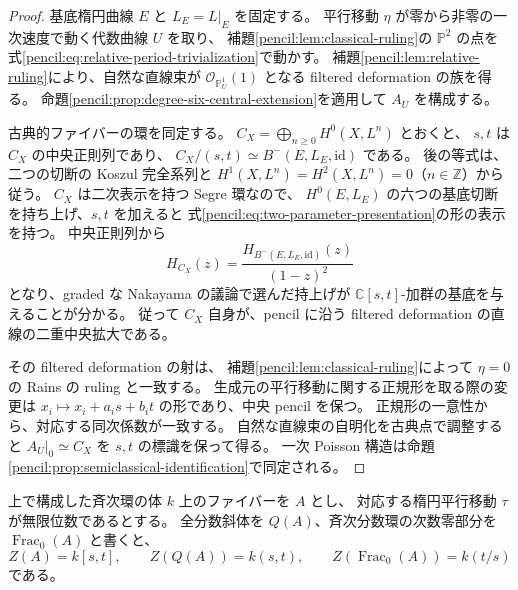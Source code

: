 \begin{proof}
基底楕円曲線 $E$ と $L_E=L|_E$ を固定する。
平行移動 $\eta$ が零から非零の一次速度で動く代数曲線 $U$ を取り、
補題\ref{pencil:lem:classical-ruling}の $\mathbb P^2$ の点を
式\eqref{pencil:eq:relative-period-trivialization}で動かす。
補題\ref{pencil:lem:relative-ruling}により、自然な直線束が
$\mathcal O_{\mathbb P^1_U}(1)$ となる filtered deformation の族を得る。
命題\ref{pencil:prop:degree-six-central-extension}を適用して $A_U$ を構成する。

古典的ファイバーの環を同定する。
$C_X=\bigoplus_{n\geq0}H^0(X,L^n)$ とおくと、
$s,t$ は $C_X$ の中央正則列であり、
$C_X/(s,t)\simeq B^{-}(E,L_E,\mathrm{id})$ である。
後の等式は、二つの切断の Koszul 完全系列と
$H^1(X,L^n)=H^2(X,L^n)=0$（$n\in\mathbb Z$）から従う。
$C_X$ は二次表示を持つ Segre 環なので、
$H^0(E,L_E)$ の六つの基底切断を持ち上げ、$s,t$ を加えると
式\eqref{pencil:eq:two-parameter-presentation}の形の表示を持つ。
中央正則列から
\[
 H_{C_X}(z)=\frac{H_{B^{-}(E,L_E,\mathrm{id})}(z)}{(1-z)^2}
\]
となり、graded な Nakayama の議論で選んだ持上げが
$\mathbb C[s,t]$-加群の基底を与えることが分かる。
従って $C_X$ 自身が、pencil に沿う filtered deformation の直線の二重中央拡大である。

その filtered deformation の射は、
補題\ref{pencil:lem:classical-ruling}によって $\eta=0$ の Rains の ruling と一致する。
生成元の平行移動に関する正規形を取る際の変更は
$x_i\mapsto x_i+a_i s+b_i t$ の形であり、中央 pencil を保つ。
正規形の一意性から、対応する同次係数が一致する。
自然な直線束の自明化を古典点で調整すると
$A_U|_0\simeq C_X$ を $s,t$ の標識を保って得る。
一次 Poisson 構造は命題\ref{pencil:prop:semiclassical-identification}で同定される。
\end{proof}

\begin{proposition}\label{pencil:prop:generic-center}
上で構成した斉次環の体 $k$ 上のファイバーを $A$ とし、
対応する楕円平行移動 $\tau$ が無限位数であるとする。
全分数斜体を $Q(A)$、斉次分数環の次数零部分を $\operatorname{Frac}_0(A)$ と書くと、
\[
 Z(A)=k[s,t],\qquad
 Z(Q(A))=k(s,t),\qquad
 Z(\operatorname{Frac}_0(A))=k(t/s)
\]
である。
\end{proposition}

